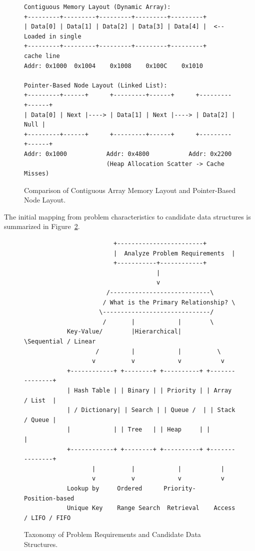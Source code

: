\documentclass[12pt]{report}
\begin{document}
\begin{figure}[htbp]
\centering
\begin{verbatim}
Contiguous Memory Layout (Dynamic Array):
+---------+---------+---------+---------+---------+
| Data[0] | Data[1] | Data[2] | Data[3] | Data[4] |  <-- Loaded in single
+---------+---------+---------+---------+---------+      cache line
Addr: 0x1000  0x1004    0x1008    0x100C    0x1010

Pointer-Based Node Layout (Linked List):
+---------+------+      +---------+------+      +---------+------+
| Data[0] | Next |----> | Data[1] | Next |----> | Data[2] | Null |
+---------+------+      +---------+------+      +---------+------+
Addr: 0x1000           Addr: 0x4800           Addr: 0x2200
                       (Heap Allocation Scatter -> Cache Misses)
\end{verbatim}
\caption{Comparison of Contiguous Array Memory Layout and Pointer-Based Node Layout.}
\label{fig:memory_layout}
\end{figure}

The initial mapping from problem characteristics to candidate data structures is summarized in Figure~\ref{fig:selection_flowchart}.

\begin{figure}[htbp]
\centering
\begin{verbatim}
                         +------------------------+
                         |  Analyze Problem Requirements  |
                         +-----------+------------+
                                     |
                                     v
                       /----------------------------\
                      / What is the Primary Relationship? \
                     \------------------------------/
                      /       |            |        \
            Key-Value/        |Hierarchical|         \Sequential / Linear
                    /         |            |          \
                   v          v            v           v
            +------------+ +--------+ +----------+ +---------------+
            | Hash Table | | Binary | | Priority | | Array / List  |
            | / Dictionary| | Search | | Queue /  | | Stack / Queue |
            |            | | Tree   | | Heap     | |               |
            +------------+ +--------+ +----------+ +---------------+
                   |          |            |           |
                   v          v            v           v
            Lookup by     Ordered      Priority-    Position-based
            Unique Key    Range Search  Retrieval    Access / LIFO / FIFO
\end{verbatim}
\caption{Taxonomy of Problem Requirements and Candidate Data Structures.}
\label{fig:selection_flowchart}
\end{figure}
\end{document}
